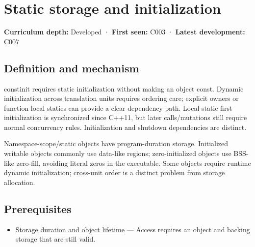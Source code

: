\hypertarget{appendix-17c93c4c2f19}{}\label{referencestart:appendix-17c93c4c2f19}
\section{Static storage and initialization}\label{appendix-17c93c4c2f19-static-storage-and-initialization}

\hypertarget{appendix-17c93c4c2f19-static-storage-and-initialization}{}

\textbf{Curriculum depth:} Developed · \textbf{First seen:} C003 · \textbf{Latest development:} C007

\begin{allmightroledefinition}

\subsection{Definition and mechanism}\label{appendix-17c93c4c2f19-definition-and-mechanism}

\hypertarget{appendix-17c93c4c2f19-definition-and-mechanism}{}

constinit requires static initialization without making an object const. Dynamic initialization across translation units requires ordering care; explicit owners or function-local statics can provide a clear dependency path. Local-static first initialization is synchronized since C++11, but later calls/mutations still require normal concurrency rules. Initialization and shutdown dependencies are distinct.

\end{allmightroledefinition}

Namespace-scope/static objects have program-duration storage. Initialized writable objects commonly use data-like regions; zero-initialized objects use BSS-like zero-fill, avoiding literal zeros in the executable. Some objects require runtime dynamic initialization; cross-unit order is a distinct problem from storage allocation.

\subsection{Prerequisites}\label{appendix-17c93c4c2f19-prerequisites}

\hypertarget{appendix-17c93c4c2f19-prerequisites}{}

\begin{itemize}
\tightlist
\item
  \hyperref[appendix-0b104bcba06b]{Storage duration and object lifetime} --- Access requires an object and backing storage that are still valid.
\end{itemize}

